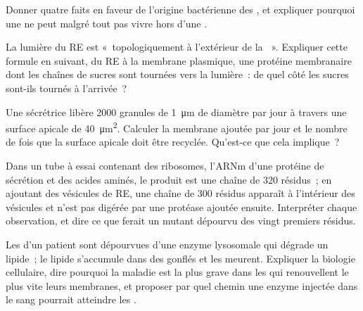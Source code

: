 \begin{exercise}[$\star\star$]\label{exo:b1:eukaryotic-cell:7}
Donner quatre faits en faveur de l'origine bactérienne des
, et expliquer pourquoi une  ne peut malgré
tout pas vivre hors d'une .
\end{exercise}

\begin{exercise}[$\star\star$]\label{exo:b1:eukaryotic-cell:8}
La lumière du RE est «~topologiquement à l'extérieur de la ~».
Expliquer cette formule en suivant, du RE à la membrane plasmique, une
protéine membranaire dont les chaînes de sucres sont tournées vers la
lumière~: de quel côté les sucres sont-ils tournés à l'arrivée~?
\end{exercise}

\begin{exercise}[$\star\star$]\label{exo:b1:eukaryotic-cell:9}
Une  sécrétrice libère \qty{2000}{} granules de \qty{1}{\micro m}
de diamètre par jour à travers une surface apicale de
\qty{40}{\micro m^2}. Calculer la membrane ajoutée par jour et le nombre
de fois que la surface apicale doit être recyclée. Qu'est-ce que cela
implique~?
\end{exercise}

\begin{exercise}[$\star\star\star$]\label{exo:b1:eukaryotic-cell:10}
Dans un tube à essai contenant des ribosomes, l'ARNm d'une protéine de
sécrétion et des acides aminés, le produit est une chaîne de
\qty{320}{} résidus~; en ajoutant des vésicules de RE, une chaîne de
\qty{300}{} résidus apparaît à l'intérieur des vésicules et n'est pas
digérée par une protéase ajoutée ensuite. Interpréter chaque
observation, et dire ce que ferait un mutant dépourvu des vingt premiers
résidus.
\end{exercise}

\begin{exercise}[$\star\star\star$]\label{exo:b1:eukaryotic-cell:11}
Les  d'un patient sont dépourvues d'une enzyme lysosomale qui
dégrade un lipide~; le lipide s'accumule dans des  gonflés et
les  meurent. Expliquer la biologie cellulaire, dire pourquoi la
maladie est la plus grave dans les  qui renouvellent le plus
vite leurs membranes, et proposer par quel chemin une enzyme injectée
dans le sang pourrait atteindre les .
\end{exercise}

